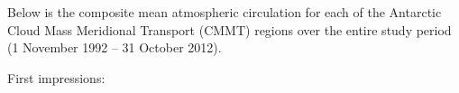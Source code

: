 Below is the composite mean atmospheric circulation for each of the Antarctic Cloud Mass Meridional Transport (CMMT) regions over the entire study period (1 November 1992 -- 31 October 2012).

First impressions:
